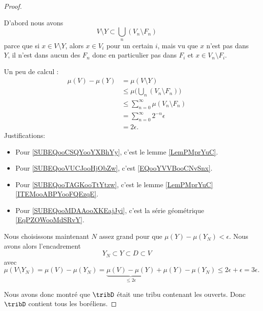 \begin{proof}
\begin{subproof}
\begin{subproof}
			D'abord nous avons
			\begin{equation}        \label{EQooYVVBooCNvSnx}
				V\setminus Y\subset \bigcup_n(V_n\setminus F_n)
			\end{equation}
			parce que si \( x\in V\setminus Y\), alors \( x\in V_i\) pour un certain \( i\), mais vu que \( x\) n'est pas dans \( Y\), il n'est dans aucun des \( F_n\) donc en particulier pas dans \( F_i\) et \( x\in V_n\setminus F_i\).

			Un peu de calcul :
			\begin{subequations}
				\begin{align}
					\mu(V)-\mu(Y) & = \mu(V\setminus Y)   \label{SUBEQooCSQYooYXBhYy}                              \\
					              & \leq\mu\big( \bigcup_n(V_n\setminus F_n) \big)     \label{SUBEQooVUCJooHjObZw} \\
					              & \leq \sum_{n=0}^{\infty}\mu(V_n\setminus F_n)      \label{SUBEQooTAGKooTtYtzw} \\
					              & =\sum_{n=0}^{\infty}2^{-n}\epsilon                                             \\
					              & =2\epsilon.        \label{SUBEQooMDAAooXKEajJyi}
				\end{align}
			\end{subequations}
			Justifications:
			\begin{itemize}
				\item Pour \eqref{SUBEQooCSQYooYXBhYy}, c'est le lemme \ref{LemPMprYuC}.
				\item Pour \eqref{SUBEQooVUCJooHjObZw}, c'est \eqref{EQooYVVBooCNvSnx}.
				\item Pour \eqref{SUBEQooTAGKooTtYtzw}, c'est le lemme \ref{LemPMprYuC}\ref{ITEMooABPYooFQEzqE}.
				\item Pour \eqref{SUBEQooMDAAooXKEajJyi}, c'est la série géométrique \eqref{EqPZOWooMdSRvY}.
			\end{itemize}

			Nous choisissons maintenant \( N\) assez grand pour que \( \mu(Y)-\mu(Y_N)<\epsilon\). Nous avons alors l'encadrement
			\begin{equation}
				Y_N\subset Y\subset D\subset V
			\end{equation}
			avec
			\begin{equation}
				\mu(V\setminus Y_N)=\mu(V)-\mu(Y_N)=\underbrace{\mu(V)-\mu(Y)}_{\leq 2\epsilon}+\mu(Y)-\mu(Y_N)\leq 2\epsilon+\epsilon=3\epsilon.
			\end{equation}
		\end{subproof}
	\end{subproof}
	Nous avons donc montré que \( \tribD\) était une tribu contenant les ouverts. Donc \( \tribD\) contient tous les boréliens.
\end{proof}

